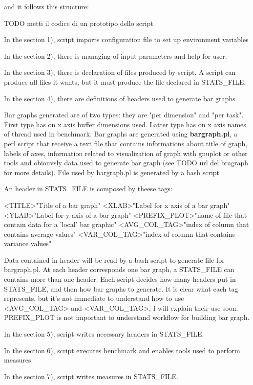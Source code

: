 \documentclass[a4paper,10pt]{article}
\begin{document}
\begin{multicols}{2}
and it follows this structure:

TODO metti il codice di un prototipo dello script

In the section 1), script imports configuration file to set up environment variables

In the section 2), there is managing of input parameters and help for user.

In the section 3), there is declaration of files produced by script.
A script can produce all files it wants, but it must produce the file declared in
STATS\_FILE.

In the section 4), there are definitions of headers used to generate bar graphs.

Bar graphs generated are of two types: they are "per dimension" and "per task". First type has on x axis buffer dimensions used.
Latter type has on x axis names of thread used in benchmark. Bar graphs are generated using \textbf{bargraph.pl}, a perl script
that receive a text file that contains informations about title of graph, labels of axes, information related to visualization of graph with gnuplot or 
other tools and obiouvsly data used to generate bar graph (see TODO url del bragraph for more details). File used by bargraph.pl is generated by
a bash script 

An header in STATS\_FILE is composed by theese tags:

<TITLE>"Title of a bar graph"
<XLAB>"Label for x axis of a bar graph"
<YLAB>"Label for y axis of a bar graph"
<PREFIX\_PLOT>"name of file that contain data for a 'local' bar graphic" 
<AVG\_COL\_TAG>"index of column that contains average values"
<VAR\_COL\_TAG>"index of column that contains variance values"

Data contained in header will be read by a bash script to generate file for bargraph.pl. At each header corresponds one bar graph, a STATS\_FILE can
contains more than one header. Each script decides how many headers put in STATS\_FILE, and then how bar graphs to generate.
It is clear what each tag represents, but it's not immediate to understand how to use <AVG\_COL\_TAG> and <VAR\_COL\_TAG>, I will explain their 
use soon. PREFIX\_PLOT is not important to understand workflow for building bar graph.

In the section 5), script writes necessary headers in STATS\_FILE.

In the section 6), script executes benchmark and enables tools used to perform measures

In the section 7), script writes measures in STATS\_FILE.


\end{multicols}
\end{document}
